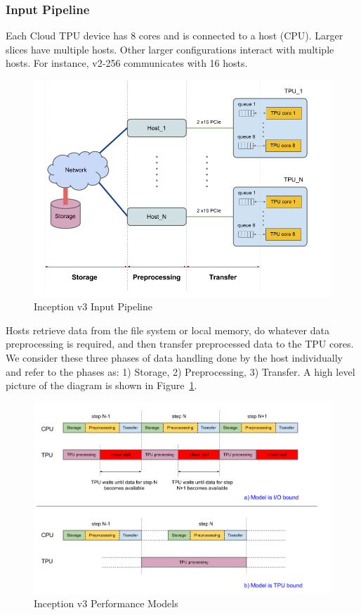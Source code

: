 \documentclass[14pt]{report}
\begin{document}
			\subsubsection{Input Pipeline}
				Each Cloud TPU device has 8 cores and is connected to a host (CPU). Larger slices have multiple hosts. Other larger configurations interact with multiple hosts. For instance, v2-256 communicates with 16 hosts.\\
				\begin{figure}[h]
					\includegraphics[width=\textwidth]{InputPipe.png}
					\centering
					\caption{Inception v3 Input Pipeline}
					\label{fig:InputPipe}
				\end{figure}

				Hosts retrieve data from the file system or local memory, do whatever data preprocessing is required, and then transfer preprocessed data to the TPU cores. We consider these three phases of data handling done by the host individually and refer to the phases as: 1) Storage, 2) Preprocessing, 3) Transfer. A high level picture of the diagram is shown in Figure~\ref{fig:InputPipe}.\\
				\begin{figure}[h]
					\includegraphics[width=\textwidth]{PerfModel.png}
					\centering
					\caption{Inception v3 Performance Models}
					\label{fig:PerfModel}
				\end{figure}
\end{document}
